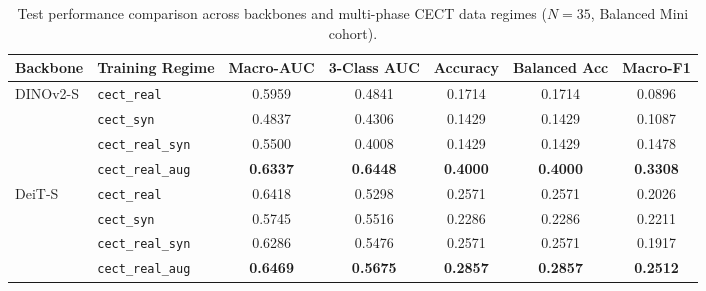 \begin{table}[t]
\centering
\caption{Test performance comparison across backbones and multi-phase CECT data regimes ($N=35$, Balanced Mini cohort).}
\label{tab:test_cect_results_mini}
\begin{tabular}{llccccc}
\toprule
\textbf{Backbone} & \textbf{Training Regime} & \textbf{Macro-AUC} & \textbf{3-Class AUC} & \textbf{Accuracy} & \textbf{Balanced Acc} & \textbf{Macro-F1} \\
\midrule
\multirow{4}{*}{DINOv2-S} & \texttt{cect\_real}       & 0.5959 & 0.4841 & 0.1714 & 0.1714 & 0.0896 \\
                          & \texttt{cect\_syn}        & 0.4837 & 0.4306 & 0.1429 & 0.1429 & 0.1087 \\
                          & \texttt{cect\_real\_syn}  & 0.5500 & 0.4008 & 0.1429 & 0.1429 & 0.1478 \\
                          & \texttt{cect\_real\_aug}  & \textbf{0.6337} & \textbf{0.6448} & \textbf{0.4000} & \textbf{0.4000} & \textbf{0.3308} \\
\midrule
\multirow{4}{*}{DeiT-S}   & \texttt{cect\_real}       & 0.6418 & 0.5298 & 0.2571 & 0.2571 & 0.2026 \\
                          & \texttt{cect\_syn}        & 0.5745 & 0.5516 & 0.2286 & 0.2286 & 0.2211 \\
                          & \texttt{cect\_real\_syn}  & 0.6286 & 0.5476 & 0.2571 & 0.2571 & 0.1917 \\
                          & \texttt{cect\_real\_aug}  & \textbf{0.6469} & \textbf{0.5675} & \textbf{0.2857} & \textbf{0.2857} & \textbf{0.2512} \\
\bottomrule
\end{tabular}
\end{table}
